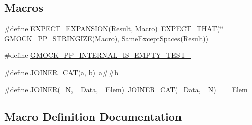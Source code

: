 \subsection*{Macros}
\begin{DoxyCompactItemize}
\item 
\#define \mbox{\hyperlink{googletest-master_2googlemock_2test_2gmock-pp-string__test_8cc_a50cfa9ecb65df9c804a5467d08da4faf}{E\+X\+P\+E\+C\+T\+\_\+\+E\+X\+P\+A\+N\+S\+I\+ON}}(Result,  Macro)~\mbox{\hyperlink{_obj__test_2lib_2googletest-release-1_88_81_2googlemock_2include_2gmock_2gmock-matchers_8h_ac31e206123aa702e1152bb2735b31409}{E\+X\+P\+E\+C\+T\+\_\+\+T\+H\+AT}}(\char`\"{}\char`\"{} \mbox{\hyperlink{_obj__test_2lib_2googletest-master_2googlemock_2include_2gmock_2internal_2gmock-pp_8h_a5e7b60e34a7bb66bac56c440f6aa52cb}{G\+M\+O\+C\+K\+\_\+\+P\+P\+\_\+\+S\+T\+R\+I\+N\+G\+I\+ZE}}(Macro), Same\+Except\+Spaces(Result))
\item 
\#define \mbox{\hyperlink{googletest-master_2googlemock_2test_2gmock-pp-string__test_8cc_ab8635d85cb91992914a106bb5c229829}{G\+M\+O\+C\+K\+\_\+\+P\+P\+\_\+\+I\+N\+T\+E\+R\+N\+A\+L\+\_\+\+I\+S\+\_\+\+E\+M\+P\+T\+Y\+\_\+\+T\+E\+S\+T\+\_}}
\item 
\#define \mbox{\hyperlink{googletest-master_2googlemock_2test_2gmock-pp-string__test_8cc_a061e03ac22467881369813e8d73ddf61}{J\+O\+I\+N\+E\+R\+\_\+\+C\+AT}}(a,  b)~a\#\#b
\item 
\#define \mbox{\hyperlink{googletest-master_2googlemock_2test_2gmock-pp-string__test_8cc_a417889002d582097e444f103350c05cb}{J\+O\+I\+N\+ER}}(\+\_\+N,  \+\_\+\+Data,  \+\_\+\+Elem)~\mbox{\hyperlink{_obj__test_2lib_2googletest-master_2googlemock_2test_2gmock-pp-string__test_8cc_a061e03ac22467881369813e8d73ddf61}{J\+O\+I\+N\+E\+R\+\_\+\+C\+AT}}(\+\_\+\+Data, \+\_\+N) = \+\_\+\+Elem
\end{DoxyCompactItemize}


\subsection{Macro Definition Documentation}
\mbox{\label{googletest-master_2googlemock_2test_2gmock-pp-string__test_8cc_a50cfa9ecb65df9c804a5467d08da4faf}} 
